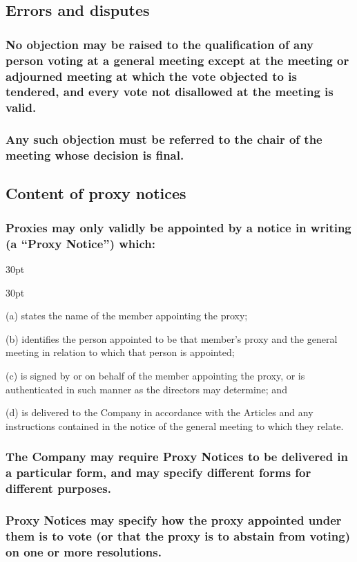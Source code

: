 \documentclass[12pt]{article}
\def\clauseindent{30pt}
\newenvironment{subindentlist}{\begin{adjustwidth}{\clauseindent}{}\begin{labeledlist}{\clauseindent}}{\end{labeledlist}\end{adjustwidth}}
\begin{document}
\subsection{Errors and disputes}
\subsubsection{No objection may be raised to the qualification of any person voting at a general meeting except at the meeting or adjourned meeting at which the vote objected to is tendered, and every vote not disallowed at the meeting is valid.}
\subsubsection{Any such objection must be referred to the chair of the meeting whose decision is final.}

\subsection{Content of proxy notices}
\subsubsection{Proxies may only validly be appointed by a notice in writing (a “Proxy Notice”) which:}
\begin{subindentlist}
    \item [(a)] states the name of the member appointing the proxy;
    \item [(b)] identifies the person appointed to be that member’s proxy and the general meeting in relation to which that person is appointed;
    \item [(c)] is signed by or on behalf of the member appointing the proxy, or is authenticated in such manner as the directors may determine; and
    \item [(d)] is delivered to the Company in accordance with the Articles and any instructions contained in the notice of the general meeting to which they relate.
\end{subindentlist}
\subsubsection{The Company may require Proxy Notices to be delivered in a particular form, and may specify different forms for different purposes.}
\subsubsection{Proxy Notices may specify how the proxy appointed under them is to vote (or that the proxy is to abstain from voting) on one or more resolutions.}
\end{document}
